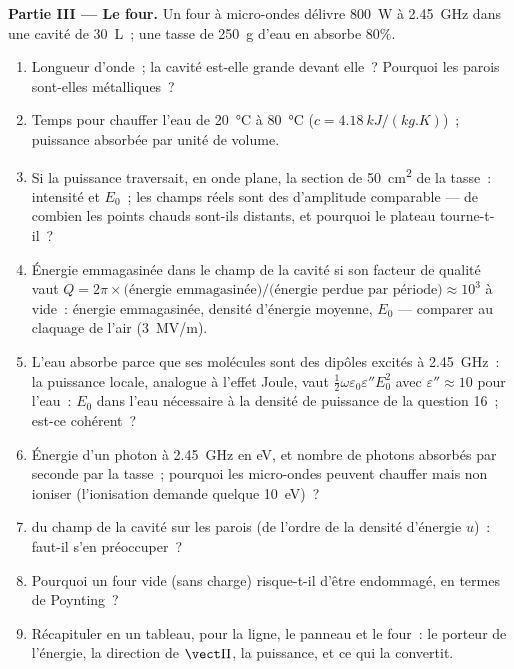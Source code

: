 \begin{problem}
\medskip
\noindent\textbf{Partie III --- Le four.}
Un four à micro-ondes délivre \qty{800}{W} à \qty{2.45}{GHz} dans une cavité de
\qty{30}{L}~; une tasse de \qty{250}{g} d'eau en absorbe $80\%$.
\begin{enumerate}[resume]
  \item Longueur d'onde~; la cavité est-elle grande devant elle~? Pourquoi les
        parois sont-elles métalliques~?
  \item Temps pour chauffer l'eau de \qty{20}{\degreeCelsius} à \qty{80}{\degreeCelsius}
        ($c = \qty{4.18}{kJ/(kg.K)}$)~; puissance absorbée par unité de volume.
  \item Si la puissance traversait, en onde plane, la section de \qty{50}{cm^2}
        de la tasse~: intensité et $E_0$~; les champs réels sont des
         d'amplitude comparable --- de combien les points chauds sont-ils
        distants, et pourquoi le plateau tourne-t-il~?
  \item Énergie emmagasinée dans le champ de la cavité si son facteur de qualité vaut
        $Q = 2\pi\times\text{(énergie emmagasinée)}/\text{(énergie perdue par période)}
        \approx 10^3$ à vide~: énergie emmagasinée, densité d'énergie moyenne, $E_0$
        --- comparer au claquage de l'air (\qty{3}{MV/m}).
  \item L'eau absorbe parce que ses molécules sont des dipôles excités à
        \qty{2.45}{GHz}~: la puissance locale, analogue à l'effet Joule, vaut $\tfrac12\omega\varepsilon_0
        \varepsilon''E_0^2$ avec $\varepsilon'' \approx 10$ pour l'eau~: $E_0$ dans l'eau
        nécessaire à la densité de puissance de la question 16~; est-ce cohérent~?
  \item Énergie d'un photon à \qty{2.45}{GHz} en eV, et nombre de photons
        absorbés par seconde par la tasse~; pourquoi les micro-ondes peuvent chauffer mais
        non ioniser (l'ionisation demande quelque \qty{10}{eV})~?
  \item {} du champ de la cavité sur les parois (de
        l'ordre de la densité d'énergie $u$)~: faut-il s'en préoccuper~?
  \item Pourquoi un four vide (sans charge) risque-t-il d'être endommagé, en termes de
        Poynting~?
  \item Récapituler en un tableau, pour la ligne, le panneau et le four~: le
        porteur de l'énergie, la direction de $\vect\Pi$, la puissance, et ce qui
        la convertit.
\end{enumerate}
\end{problem}
